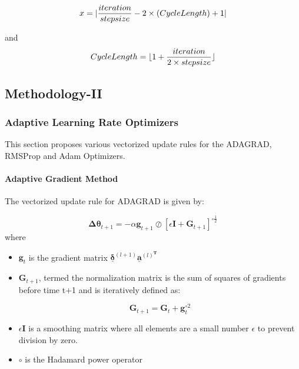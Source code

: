 \documentclass{article}
\begin{document}
\begin{equation}
	x = |\frac{iteration}{stepsize} -2\times{(Cycle \space Length)} + 1|
\end{equation}


and \begin{equation}
Cycle \space Length = \lfloor{1 + \frac{iteration}{2\times{stepsize}}}\rfloor
\end{equation}

\subsection{Methodology-II}

\subsubsection{Adaptive Learning Rate Optimizers}
This section proposes various vectorized update rules for the ADAGRAD, RMSProp and Adam Optimizers. 
\paragraph{Adaptive Gradient Method}
The vectorized update rule for ADAGRAD is given by:

\begin{equation}
\boldsymbol{\Delta{\theta}}_{t+1} = -\alpha\boldsymbol{g}_{t+1}\oslash[\epsilon\boldsymbol{I} + \boldsymbol{G}_{t+1}]^{\circ\frac{1}{2}}
\end{equation} 
where 
\begin{itemize}
	\item $\boldsymbol{g}_t$ is the gradient matrix $\underline{\boldsymbol{\delta}}^{(l+1)}\underline{\boldsymbol{a}}^{(l)^{\boldsymbol{T}}}$
	
	\item $\boldsymbol{G}_{t+1}$, termed the normalization matrix is the sum of squares of gradients before time t+1 and is iteratively defined as:
	
	\begin{equation}
	\boldsymbol{G}_{t+1} = \boldsymbol{G}_{t} + \boldsymbol{g}_{t}^{\circ{2}}
	\end{equation} 
	
	\item $\epsilon\boldsymbol{I}$ is a smoothing matrix where all elements are a small number $\epsilon$ to prevent division by zero.
	
	\item $\circ$ is the Hadamard power operator
\end{itemize}
\end{document}
